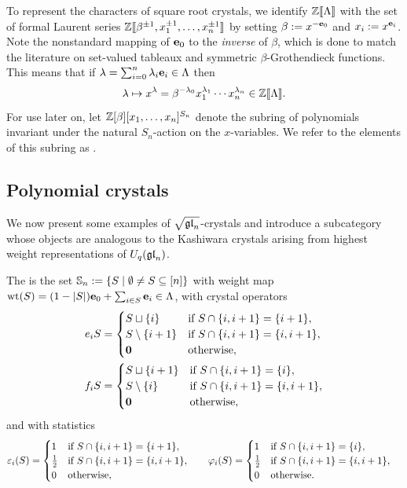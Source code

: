 \documentclass[11pt]{article}
\begin{document}
 

To represent the characters of square root crystals, we identify $\mathbb{Z}\llbracket\Lambda\rrbracket$ with the set of formal Laurent series $\mathbb{Z}\llbracket\beta^{\pm1}, x_1^{\pm1}, \dotsc, x_n^{\pm 1}\rrbracket$ by setting $\beta := x^{-\textbf{e}_0}$ and $x_i := x^{\textbf{e}_i}$.
Note the nonstandard mapping of $\textbf{e}_0$ to the \emph{inverse} of $\beta$, which is done to match the literature on set-valued tableaux and symmetric $\beta$-Grothendieck functions.
This means that if $\lambda= \sum_{i=0}^n \lambda_i \textbf{e}_i \in \Lambda$ then
\[
\lambda \mapsto x^{\lambda} = \beta^{-\lambda_0} x_1^{\lambda_1} \cdots x_n^{\lambda_n} \in \mathbb{Z}\llbracket\Lambda\rrbracket.
\]
For use later on, let $\mathbb{Z}[\beta][x_1, \dotsc, x_n]^{S_n}$ denote the subring of polynomials invariant under the natural $S_n$-action on the $x$-variables. We refer to the elements of this subring as .



\subsection{Polynomial crystals}

We now present some examples of $\sqrt{\mathfrak{gl}_n}$-crystals and introduce a subcategory whose objects are analogous to the Kashiwara crystals arising from highest weight representations of $U_q(\mathfrak{gl}_n)$.

\begin{definition}[{\cite{MT2023,Yu23}}]
The  is 
the set
$
\mathbb{S}_n := \{ S \mid \emptyset \neq S \subseteq [n]\}
$
with weight map $\operatorname{wt}(S) = (1 - \lvert S \rvert)\textbf{e}_0 +\sum_{i \in S} \textbf{e}_i \in \Lambda$, with crystal operators
\[ \ba e_i S &= \begin{cases}
S\sqcup \{i\}&\text{if }S\cap \{i,i+1\} = \{i+1\}, \\
S\setminus \{i+1\}&\text{if }S\cap \{i,i+1\} = \{i,i+1\}, \\
\zero&\text{otherwise},
\end{cases}
\allowdisplaybreaks \\
f_iS &= \begin{cases}
S\sqcup \{i+1\}&\text{if }S\cap \{i,i+1\} = \{i\}, \\
S\setminus \{i\}&\text{if }S\cap \{i,i+1\} = \{i,i+1\}, \\
\zero&\text{otherwise},
\end{cases}
\ea
\]
and with statistics
\[
\begin{aligned} \varepsilon_i(S) &= \begin{cases}
1&\text{if }S\cap \{i,i+1\} = \{i+1\}, \\
\frac{1}{2}&\text{if }S\cap \{i,i+1\} = \{i,i+1\}, \\
0&\text{otherwise},
\end{cases}
& \quad
\varphi_i(S) &= \begin{cases}
1&\text{if }S\cap \{i,i+1\} = \{i\}, \\
\frac{1}{2}&\text{if }S\cap \{i,i+1\} = \{i,i+1\}, \\
0&\text{otherwise}.
\end{cases}
\end{aligned}
\]
\end{definition}
\end{document}
